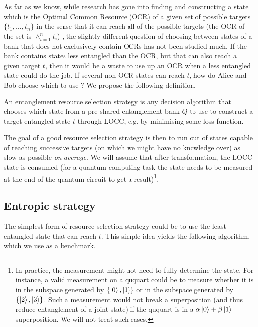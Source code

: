 As far as we know, while research has gone into finding and constructing a state which is the Optimal Common Resource (OCR) of a given set of possible targets $\{t_1, \dots, t_n\}$ in the sense that it can reach all of the possible targets (the OCR of the set is $\wedge_{i=1}^n t_i$) \cite{bosyk_optimal_2019, deside_probabilistic_2024}, the slightly different question of choosing between states of a bank that does not exclusively contain OCRs has not been studied much. If the bank contains states less entangled than the OCR, but that can also reach a given target $t$, then it would be a waste to use up an OCR when a less entangled state could do the job. If several non-OCR states can reach $t$, how do Alice and Bob choose which to use ? We propose the following definition.

\begin{definition}
    An entanglement resource selection strategy is any decision algorithm that chooses which state from a pre-shared entanglement bank $Q$ to use to construct a target entangled state $t$ through LOCC, e.g. by minimising some loss function.
\end{definition}

The goal of a good resource selection strategy is then to run out of states capable of reaching successive targets (on which we might have no knowledge over) as slow as possible \textit{on average}. We will assume that after transformation, the LOCC state is consumed (for a quantum computing task the state needs to be measured at the end of the quantum circuit to get a result)\footnote{In practice, the measurement might not need to fully determine the state. For instance, a valid measurement on a ququart could be to measure whether it is in the subspace generated by $\{\ket{0}, \ket{1}\}$ or in the subspace generated by $\{\ket{2}, \ket{3}\}$. Such a measurement would not break a superposition (and thus reduce entanglement of a joint state) if the ququart is in a $\alpha\ket{0} + \beta\ket{1}$ superposition. We will not treat such cases.}.



\subsection{Entropic strategy}

The simplest form of resource selection strategy could be to use the least entangled state that can reach $t$. This simple idea yields the following algorithm, which we use as a benchmark.

